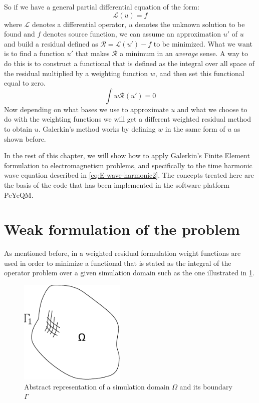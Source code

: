 So if we have a general partial differential equation of the form: 
\begin{equation}
\mathcal{L}(u) = f
\label{eq:general_form_of_DE}
\end{equation}  where $\mathcal{L}$ denotes a differential operator, $u$ denotes the unknown solution to be found and $f$ denotes source function, we can assume an approximation $u'$ of $u$ and build a residual defined as $\mathcal{R} = \mathcal{L}(u')-f$ to be minimized. What we want is to find a function $u'$ that makes $\mathcal{R}$ a minimum in an \emph{average} sense. A way to do this is to construct a functional that is defined as the integral over all space of the residual multiplied by a weighting function $w$, and then set this functional equal to zero. 
\begin{equation}
\int w \mathcal{R}(u') = 0
\end{equation}
Now depending on what bases we use to approximate $u$ and what we choose to do with the weighting functions we will get a different weighted residual method to obtain $u$. 
Galerkin's method works by defining $w$ in the same form of $u$ as shown before.

In the rest of this chapter, we will show how to apply Galerkin's Finite Element formulation to electromagnetism problems, and specifically to the time harmonic wave equation described in \ref{eq:E-wave-harmonic2}. The concepts treated here are the basis of the code that has been implemented in the software platform PeYeQM.

\section{Weak formulation of the problem}

As mentioned before, in a weighted residual formulation weight functions  are used in order to minimize a functional that is stated as the integral of the operator problem over a given  simulation domain such as the one illustrated in \ref{fig:domain}. 

\begin{figure}[h]
\centering
\includegraphics[height=5cm]{./img/dominio.pdf}
\caption{Abstract representation of a simulation domain $\Omega$ and its boundary $\Gamma$}
\label{fig:domain}
\end{figure}

